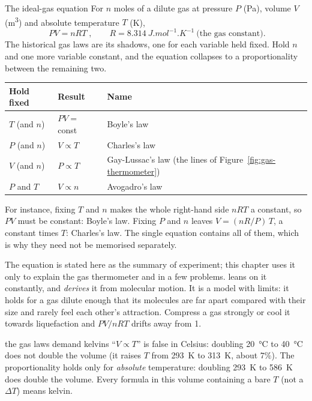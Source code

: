 
\begin{keybox}{The ideal-gas equation}
For $n$ moles of a dilute gas at pressure $P$ (\si{Pa}), volume $V$ (\si{m^3}) and absolute
temperature $T$ (\si{K}),
\[
\boxed{\;PV = nRT\;}, \qquad R = \SI{8.314}{J.mol^{-1}.K^{-1}}\ \text{(the gas constant)}.
\]
The historical gas laws are its shadows, one for each variable held fixed. Hold $n$ and one more
variable constant, and the equation collapses to a proportionality between the remaining two.
\begin{center}
\begin{tabular}{@{}lll@{}}
\toprule
Hold fixed & Result & Name\\
\midrule
$T$ (and $n$) & $PV = $ const & Boyle's law\\
$P$ (and $n$) & $V \propto T$ & Charles's law\\
$V$ (and $n$) & $P \propto T$ & Gay-Lussac's law (the lines of Figure~\ref{fig:gas-thermometer})\\
$P$ and $T$ & $V \propto n$ & Avogadro's law\\
\bottomrule
\end{tabular}
\end{center}
For instance, fixing $T$ and $n$ makes the whole right-hand side $nRT$ a constant, so $PV$ must be
constant: Boyle's law. Fixing $P$ and $n$ leaves $V = (nR/P)\,T$, a constant times $T$: Charles's law.
The single equation contains all of them, which is why they need not be memorised separately.
\end{keybox}

The equation is stated here as the summary of experiment; this chapter uses it only to explain the gas
thermometer and in a few problems.  leans on it constantly, and 
\emph{derives} it from molecular motion. It is a model with limits: it holds for a gas dilute enough
that its molecules are far apart compared with their size and rarely feel each other's attraction.
Compress a gas strongly or cool it towards liquefaction and $PV/nRT$ drifts away from 1.

\begin{trapbox}{the gas laws demand kelvins}
``$V\propto T$'' is false in Celsius: doubling \SI{20}{\celsius} to \SI{40}{\celsius} does not double
the volume (it raises $T$ from \SI{293}{K} to \SI{313}{K}, about $7\%$). The proportionality holds only
for \emph{absolute} temperature: doubling \SI{293}{K} to \SI{586}{K} does double the volume. Every
formula in this volume containing a bare $T$ (not a $\Delta T$) means kelvin.
\end{trapbox}

